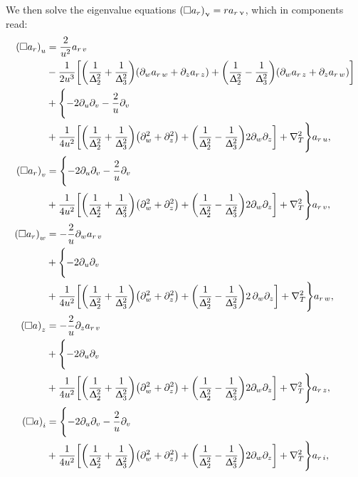 We then solve the eigenvalue equations $\qty( \square a_r )_{\upnu} = r a_{r\,\upnu}$, which in components read:
\begin{equation}
  \begin{split}
    \qty( \square a_r )_u
    & =
    \frac{2}{u^2} a_{r\,v}
    \\
    & -
    \frac{1}{2 u^3}
    \qty[%
      \qty( \frac{1}{\Delta_2^2} + \frac{1}{\Delta_3^2} )
      \qty( \ipd{w} a_{r\,w} + \ipd{z} a_{r\,z} )
      +
      \qty( \frac{1}{\Delta_2^2} - \frac{1}{\Delta_3^2} )
      \qty( \ipd{w} a_{r\,z} + \ipd{z} a_{r\,w} )
    ]
    \\
    & +
    \Biggl\lbrace
      - 2 \ipd{u} \ipd{v}
      - \frac{2}{u} \ipd{v}
      \\
      & +
      \frac{1}{4 u^2}
      \qty[
        \qty( \frac{1}{\Delta_2^2} + \frac{1}{\Delta_3^2} )
        \qty( \ipd{w}^2 + \ipd{z}^2 )
        +
        \qty( \frac{1}{\Delta_2^2} - \frac{1}{\Delta_3^2} )
        2 \ipd{w} \ipd{z}
      ]
      + \nabla^2_T
    \Biggr\rbrace
    a_{r\,u},
    \\
    \qty( \square a_r )_v
    & =
    \Biggl\lbrace
      - 2 \ipd{u} \ipd{v}
      - \frac{2}{u} \ipd{v}
      \\
      & +
      \frac{1}{4 u^2}
      \qty[%
        \qty( \frac{1}{\Delta_2^2} + \frac{1}{\Delta_3^2} )
        \qty( \ipd{w}^2 + \ipd{z}^2 )
        +
        \qty( \frac{1}{\Delta_2^2} - \frac{1}{\Delta_3^2} )
        2 \ipd{w} \ipd{z}
      ]
      + \nabla^2_T
    \Biggr\rbrace
    a_{r\,v},
    \\
    \qty( \square a_r )_w
    & =
    - \frac{2}{u} \ipd{w} a_{r\,v}
    \\
    & +
    \Biggl\lbrace
      - 2 \ipd{u} \ipd{v} 
      \\
      & +
      \frac{1}{4 u^2}
      \qty[%
        \qty( \frac{1}{\Delta_2^2} + \frac{1}{\Delta_3^2} )
        \qty( \ipd{w}^2 + \ipd{z}^2 )
        + 
        \qty( \frac{1}{\Delta_2^2} - \frac{1}{\Delta_3^2} )
        2\, \ipd{w} \ipd{z}
      ]
      + \nabla^2_T
    \Biggr\rbrace
    a_{r\,w},
    \\
    \qty( \square a )_z
    & =
    - \frac{2}{u} \ipd{z} a_{r\,v}
    \\
    & +
    \Biggl\lbrace
      - 2 \ipd{u} \ipd{v}
      \\
      & +
      \frac{1}{4 u^2}
      \qty[%
        \qty( \frac{1}{\Delta_2^2} + \frac{1}{\Delta_3^2} )
        \qty( \ipd{w}^2 + \ipd{z}^2 )
        + 
        \qty( \frac{1}{\Delta_2^2} - \frac{1}{\Delta_3^2} )
        2 \ipd{w} \ipd{z}
      ]
      + \nabla^2_T
    \Biggr\rbrace
    a_{r\,z},
    \\
    \qty( \square a )_i
    & =
    \Biggl\lbrace
      - 2 \ipd{u} \ipd{v}
      - \frac{2}{u} \ipd{v}
      \\
      & +
      \frac{1}{4 u^2}
      \qty[%
        \qty( \frac{1}{\Delta_2^2} + \frac{1}{\Delta_3^2} )
        \qty( \ipd{w}^2 + \ipd{z}^2 )
        +
        \qty( \frac{1}{\Delta_2^2} - \frac{1}{\Delta_3^2} )
        2 \ipd{w} \ipd{z}
      ]
      + \nabla^2_T
    \Biggr\rbrace
    a_{r\,i},
  \end{split}
\end{equation}
